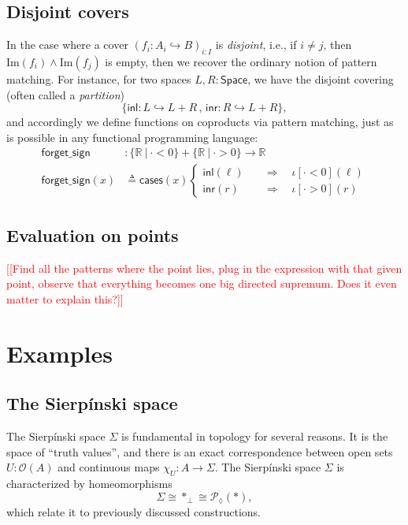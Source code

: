 \documentclass[conference]{IEEEtran}
\newcommand{\Space}{\mathsf{Space}}
\newcommand{\PLower}{\mathcal{P}_\lozenge}
\newcommand{\hookto}{\hookrightarrow}
\newcommand{\R}{\mathbb{R}}
\newcommand{\suchthat}{\ |\ }
\newcommand{\One}{\ast}
\newcommand{\Open}[1]{\mathcal{O}({#1})}
\newcommand{\Img}[1]{\text{Im}\left({#1}\right)}
\newcommand{\oinclf}[1]{\iota[{#1}]}
\newcommand{\oincl}[2]{\oinclf{#1} \left({#2}\right)}
\newcommand{\Branch}{\Rightarrow}
\newcommand{\note}[1]{\textcolor{red}{[[{#1}]]}}
\begin{document}
\subsection{Disjoint covers}

In the case where a cover $\left( f_i : A_i \hookto B \right)_{i : I}$ is \emph{disjoint}, i.e., if $i \ne j$, then $\Img{f_i} \wedge \Img{f_j}$ is empty, then we recover the ordinary notion of pattern matching. For instance, for two spaces $L, R : \Space$, we have the disjoint covering (often called a \emph{partition})
\[
\{ \mathsf{inl} : L \hookto L + R \,,\, \mathsf{inr} : R \hookto L + R \},
\]
and accordingly we define functions on coproducts via pattern matching, just as is possible in any functional programming language:
\begin{align*}
\mathsf{forget\_sign} &: \{ \R \suchthat \cdot < 0 \} + \{ \R \suchthat \cdot > 0 \} \to \R
\\ \mathsf{forget\_sign}(x) &\triangleq
  \mathsf{cases}(x)
  \begin{cases}
  \mathsf{inl}(\ell) \quad &\Branch \quad \oincl{\cdot < 0}{\ell}
  \\ \mathsf{inr}(r) \quad &\Branch \quad \oincl{\cdot > 0}{r}
  \end{cases}
\end{align*}


\subsection{Evaluation on points}

\note{Find all the patterns where the point lies, plug in the expression with that given point, observe that everything becomes one big directed supremum. Does it even matter to explain this?}

\section{Examples}

\subsection{The Sierp\'inski space}

The Sierp\'inski space $\Sigma$ is fundamental in topology for several reasons. It is the space of ``truth values'', and there is an exact correspondence between open sets $U : \Open{A}$ and continuous maps $\chi_U : A \to \Sigma$. The Sierp\'inski space $\Sigma$ is characterized by homeomorphisms
\[
\Sigma \cong \One_\bot \cong \PLower(\One) ,
\]
which relate it to previously discussed constructions.
\end{document}
